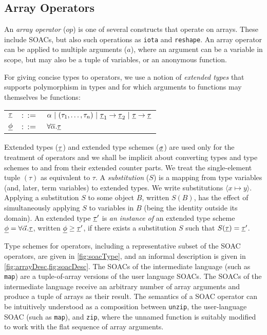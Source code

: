 \subsection{Array Operators}

An \textit{array operator} ($op$) is one of several constructs that
operate on arrays.  These include SOACs, but also such operations as
\lstinline{iota} and \lstinline{reshape}.  An array operator can be
applied to multiple arguments ($a$), where an argument can be a
variable in scope, but may also be a tuple of variables, or an
anonymous function.

For giving concise types to operators, we use a notion of \emph{extended
types} that supports polymorphism in types and for which arguments to
functions may themselves be functions:

\begin{tabular}{lrl}
$\underline{\tau}$ & $::=$ & $\alpha~|~(\tau_{1}, \ldots, \tau_{n})~|~\underline{\tau}_1 \rightarrow \underline{\tau}_2~|~\underline{\tau} \rightarrow \underline{\tau}$ \\
$\underline{\phi}$ & $::=$ & $\forall\overline{\alpha}.\underline{\tau}$
\end{tabular}

\noindent Extended types ($\underline{\tau}$) and extended type schemes
($\underline{\sigma}$) are used only for the treatment of operators and we
shall be implicit about converting types and type schemes to and from
their extended counter parts.  We treat the single-element tuple
$(\tau)$ as equivalent to $\tau$.  A \emph{substitution} ($S$) is a
mapping from type variables (and, later, term variables) to extended
types.  We write substitutions $\langle x\mapsto y\rangle$.  Applying
a substitution $S$ to some object $B$, written $S(B)$, has the effect
of simultaneously applying $S$ to variables in $B$ (being the identity
outside its domain).  An extended type $\underline{\tau}'$ is \emph{an instance
  of} an extended type scheme $\underline{\phi} = \forall \vec{\alpha}.\underline{\tau}$,
written $\underline{\phi} \geq \underline{\tau}'$, if there exists a substitution $S$ such
that $S(\underline{\tau}) = \underline{\tau}'$.

Type schemes for operators, including a representative subset of the
SOAC operators, are given in \cref{fig:soacType}, and an informal
description is given in \cref{fig:arrayDesc,fig:soacDesc}.  The SOACs
of the intermediate language (such as \lstinline{map}) are a
tuple-of-array versions of the user language SOACs. The SOACs of the
intermediate language receive an arbitrary number of array arguments
and produce a tuple of arrays as their result.  The semantics of a
SOAC operator can be intuitively understood as a composition between
\lstinline{unzip}, the user-language SOAC (such as \lstinline{map}),
and \lstinline{zip}, where the unnamed function is suitably modified
to work with the flat sequence of array arguments.

